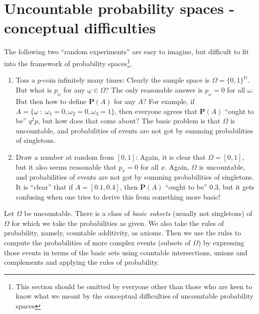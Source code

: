 \documentclass[preprint,  11pt]{amsart}
\newcommand{\para}[1]{\vspace{4mm}\noindent{\bfseries #1:}}
\def\ome{\omega}
\theoremstyle{plain} %
\theoremstyle{definition} %
\begin{document}
{\color{magenta}
\section{Uncountable probability spaces - conceptual difficulties}
The following two ``random experiments'' are easy to imagine, but difficult to fit into the framework of probability spaces\footnote{This section should be omitted by everyone other than those who are keen to know what we meant by the conceptual difficulties of uncountable probability spaces}.
\begin{enumerate}\setlength\itemsep{6pt}
\item Toss a $p$-coin infinitely many times: Clearly the sample space is $\Omega=\{0,1\}^{\mathbb{N}}$. But what is $p_{\underline{\ome}}$ for any $\underline{\ome}\in \Omega$? The only reasonable answer is $p_{\underline{\ome}}=0$ for all $\omega$. But then how to define $\mathbf{P}(A)$ for any $A$?   For example, if $A=\{\underline{\ome}{\; : \;} \omega_{1}=0,\omega_{2}=0,\omega_{3}=1\}$, then everyone agrees that $\mathbf{P}(A)$ ``ought to be'' $q^{2}p$, but how does that come about? The basic problem is that $\Omega$ is uncountable, and probabilities of events are not got by summing probabilities of singletons.
\item Draw a number at random from $[0,1]$: Again, it is clear that $\Omega=[0,1]$, but it also seems reasonable that $p_{x}=0$ for all $x$. Again, $\Omega$ is uncountable, and probabilities of events are not got by summing probabilities of singletons. It is ``clear'' that if $A=[0.1,0.4]$, then $\mathbf{P}(A)$ ``ought to be'' $0.3$, but it gets confusing when one tries to derive this from something more basic!
\end{enumerate}

\para{The resolution} Let $\Omega$ be uncountable. There is a class of {\em basic subsets} (usually not singletons) of $\Omega$ for which we take the probabilities as given. We also take the rules of probability, namely, countable additivity, as axioms. Then we use the rules to compute the probabilities of more complex events (subsets of $\Omega$) by expressing those events in terms of the basic sets using countable intersections, unions and complements and applying the rules of probability.

}
\end{document}
